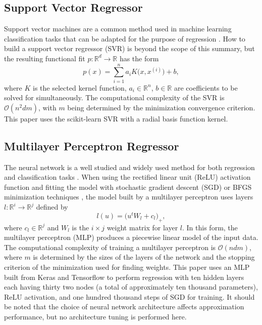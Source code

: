 \subsection{Support Vector Regressor}
\label{sec:svr}
Support vector machines are a common method used in machine learning
classification tasks that can be adapted for the purpose of regression
\cite{basak2007support}. How to build a support vector regressor (SVR)
is beyond the scope of this summary, but the resulting functional fit
$p : \mathbb{R}^d \rightarrow \mathbb{R}$ has the form
 $$ p(x)  = \sum_{i=1}^{n}a_i K\bigl(x,x^{(i)}\bigr) + b ,$$
where $K$ is the selected kernel function, $a_i \in \mathbb{R}^n$, 
$b \in \mathbb{R}$ are coefficients to be solved for simultaneously.
The computational complexity of the SVR is $\mathcal{O}(n^2dm)$, with
$m$ being determined by the minimization convergence criterion. This
paper uses the scikit-learn SVR \cite{scikit-learn} with a radial
basis function kernel.

\subsection{Multilayer Perceptron Regressor}
\label{sec:mlp}
The neural network is a well studied and widely used method for both
regression and classification tasks
\cite{hornik1989multilayer,rumelhart1988learning}. When using the
rectified linear unit (ReLU) activation function
\cite{dahl2013improving} and fitting the model with stochastic
gradient descent (SGD) or BFGS minimization techniques
\cite{goh2017why,moller1993scaled,robbins1951stochastic}, the model
built by a multilayer perceptron uses layers $l : \mathbb{R}^{i}
\rightarrow \mathbb{R}^{j}$ defined by
 $$ l(u) = \bigl( u^t W_l + c_l \bigr)_+ ,$$
where $c_l \in \mathbb{R}^j$ and $W_l$ is the $i \times j$ weight
matrix for layer $l$. In this form, the multilayer perceptron (MLP)
produces a piecewise linear model of the input data. The computational
complexity of training a multilayer perceptron is $\mathcal{O}(n d
m)$, where $m$ is determined by the sizes of the layers of the network
and the stopping criterion of the minimization used for finding
weights. This paper uses an MLP built from Keras and Tensorflow to
perform regression \cite{tensorflow2015-whitepaper,chollet2015keras}
with ten hidden layers each having thirty two nodes (a total of
approximately ten thousand parameters), ReLU activation, and
one hundred thousand steps of SGD
for training. It should be noted that the choice of neural
  network architecture affects approximation performance, but no
  architecture tuning is performed here.

